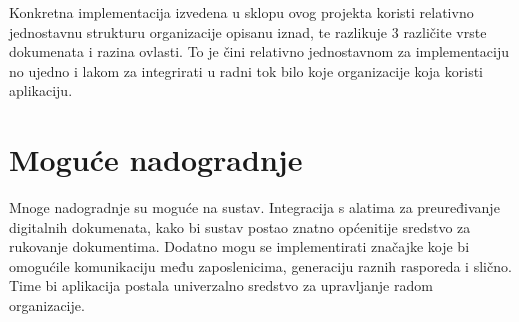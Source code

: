 	Konkretna implementacija izvedena u sklopu ovog projekta koristi relativno jednostavnu strukturu organizacije opisanu iznad, te razlikuje 3 različite vrste dokumenata i razina ovlasti. To je čini relativno jednostavnom za implementaciju no ujedno i lakom za integrirati u radni tok bilo koje organizacije koja koristi aplikaciju. 
	
	\section{Moguće nadogradnje}
	
	Mnoge nadogradnje su moguće na sustav. Integracija s alatima za preuređivanje digitalnih dokumenata, kako bi sustav postao znatno općenitije sredstvo za rukovanje dokumentima. Dodatno mogu se implementirati značajke koje bi omogućile komunikaciju među zaposlenicima,  generaciju raznih rasporeda i slično. Time bi aplikacija postala univerzalno sredstvo za upravljanje radom organizacije.
	

		
		
	